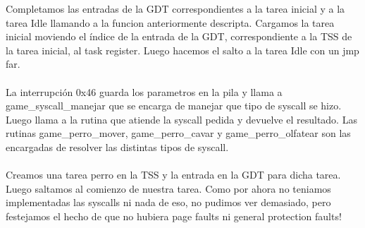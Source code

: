 \documentclass[10pt,a4paper,spanish]{article}
\begin{document}
Completamos las entradas de la GDT correspondientes a la tarea inicial y a la tarea Idle llamando a la funcion anteriormente descripta.
Cargamos la tarea inicial moviendo el índice de la entrada de la GDT, correspondiente a la TSS de la tarea inicial, al task register. Luego hacemos el salto a la tarea Idle con un jmp far.
\\ \\
La interrupción 0x46 guarda los parametros en la pila y llama a game\_syscall\_manejar que se encarga de manejar que tipo de syscall se hizo. Luego llama a la rutina que atiende la syscall pedida y devuelve el resultado. Las rutinas game\_perro\_mover, game\_perro\_cavar y game\_perro\_olfatear son las encargadas de resolver las distintas tipos de syscall.
\\ \\
Creamos una tarea perro en la TSS y la entrada en la GDT para dicha tarea. Luego saltamos al comienzo de nuestra tarea. Como por ahora no teniamos implementadas las syscalls ni nada de eso, no pudimos ver demasiado, pero festejamos el hecho de que no hubiera page faults ni general protection faults!
\end{document}
